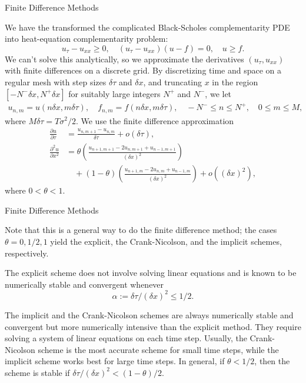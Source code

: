 \documentclass{beamer}
\begin{document}
\begin{frame}{Finite Difference Methods}

    {\footnotesize \footnotesize
    We have the transformed the complicated Black-Scholes complementarity PDE
    into  heat-equation complementarity problem:
    \[
    u_\tau - u_{xx} \geq 0, \quad (u_\tau - u_{xx})(u - f) = 0, \quad u \geq f.
    \]
    We can't solve this analytically,
    so we approximate the derivatives $(u_\tau, u_{xx})$ with finite differences on a discrete grid.
    By discretizing time and space on a regular mesh with step sizes $\delta \tau$ and $\delta x$, 
    and truncating $x$ 
    in the region $[-N^- \delta x, N^+ \delta x]$ for suitably large integers $N^+$ and $N^-$, we let
    \begin{align*}
    u_{n,m} = u(n\delta x, m\delta \tau), \quad f_{n,m} = f(n\delta x, m\delta \tau), \quad
    -N^- \leq n \leq N^+, \quad 0 \leq m \leq M,
    \end{align*}
    where $M\delta \tau = T\sigma^2/2$.
    We use the finite difference approximation
    {\footnotesize \tiny
    \begin{align*}
    \frac{\partial u}{\partial \tau} &= \frac{u_{n,m+1} - u_{n,m}}{\delta \tau} + o(\delta \tau), \\
    \frac{\partial^2 u}{\partial x^2} &= \theta \left( \frac{u_{n+1,m+1} - 2u_{n,m+1} + u_{n-1,m+1}}{(\delta x)^2} \right) \\
    &\quad + (1 - \theta) \left( \frac{u_{n+1,m} - 2u_{n,m} + u_{n-1,m}}{(\delta x)^2} \right) + o((\delta x)^2),
    \end{align*}
    }
    where $0 < \theta < 1$.  
        }
    
    
\end{frame}

\begin{frame}{Finite Difference Methods}

    {\footnotesize \footnotesize

    Note that this is a general way to do the finite difference method;
     the cases $\theta = 0, 1/2, 1$ yield the explicit, the Crank-Nicolson, and the implicit schemes, respectively.
    \vspace{1em}

    The explicit scheme does not involve solving linear equations and is known
    to be numerically stable and convergent whenever
    \[
    \alpha := \delta \tau / (\delta x)^2 \leq 1/2.
    \]

    The implicit and the Crank-Nicolson schemes are always numerically stable and convergent 
    but more numerically intensive than the explicit method. They require solving a system of 
    linear equations on each time step. Usually, the Crank-Nicolson scheme is the most accurate 
    scheme for small time steps, while the implicit scheme works best for large time steps. In general, 
    if $\theta < 1/2$, then the scheme is stable if $\delta \tau / (\delta x)^2 < (1 - \theta)/2$.
    }
    
    
\end{frame}
\end{document}
